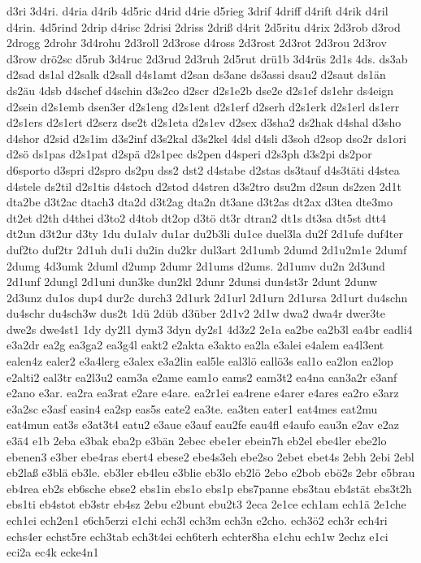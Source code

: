 {d3ri
3d4ri.
d4ria
d4rib
4d5ric
d4rid
d4rie
d5rieg
3drif
4driff
d4rift
d4rik
d4ril
d4rin.
4d5rind
2drip
d4risc
2drisi
2driss
2driß
d4rit
2d5ritu
d4rix
2d3rob
d3rod
2drogg
2drohr
3d4rohu
2d3roll
2d3rose
d4ross
2d3rost
2d3rot
2d3rou
2d3rov
d3row
drö2sc
d5rub
3d4ruc
2d3rud
2d3ruh
2d5rut
drü1b
3d4rüs
2d1s
4ds.
ds3ab
d2sad
ds1al
d2salk
d2sall
d4s1amt
d2san
ds3ane
ds3assi
dsau2
d2saut
ds1än
ds2äu
4dsb
d4schef
d4schin
d3s2co
d2scr
d2s1e2b
dse2e
d2s1ef
ds1ehr
ds4eign
d2sein
d2s1emb
dsen3er
d2s1eng
d2s1ent
d2s1erf
d2serh
d2s1erk
d2s1erl
ds1err
d2s1ers
d2s1ert
d2serz
dse2t
d2s1eta
d2s1ev
d2sex
d3sha2
ds2hak
d4shal
d3sho
d4shor
d2sid
d2s1im
d3s2inf
d3s2kal
d3s2kel
4dsl
d4sli
d3soh
d2sop
dso2r
ds1ori
d2sö
ds1pas
d2s1pat
d2spä
d2s1pec
ds2pen
d4speri
d2s3ph
d3s2pi
ds2por
d6sporto
d3spri
d2spro
ds2pu
dss2
dst2
d4stabe
d2stas
ds3tauf
d4s3täti
d4stea
d4stele
ds2til
d2s1tis
d4stoch
d2stod
d4stren
d3s2tro
dsu2m
d2sun
ds2zen
2d1t
dta2be
d3t2ac
dtach3
dta2d
d3t2ag
dta2n
dt3ane
d3t2as
dt2ax
d3tea
dte3mo
dt2et
d2th
d4thei
d3to2
d4tob
dt2op
d3tö
dt3r
dtran2
dt1s
dt3sa
dt5st
dtt4
dt2un
d3t2ur
d3ty
1du
du1alv
du1ar
du2b3li
du1ce
duel3la
du2f
2d1ufe
duf4ter
duf2to
duf2tr
2d1uh
du1i
du2in
du2kr
dul3art
2d1umb
2dumd
2d1u2m1e
2dumf
2dumg
4d3umk
2duml
d2ump
2dumr
2d1ums
d2ums.
2d1umv
du2n
2d3und
2d1unf
2dungl
2d1uni
dun3ke
dun2kl
2dunr
2dunsi
dun4st3r
2dunt
2dunw
2d3unz
du1os
dup4
dur2c
durch3
2d1urk
2d1url
2d1urn
2d1ursa
2d1urt
du4schn
du4schr
du4sch3w
dus2t
1dü
2düb
d3über
2d1v2
2d1w
dwa2
dwa4r
dwer3te
dwe2s
dwe4st1
1dy
dy2l1
dym3
3dyn
dy2s1
4d3z2
2e1a
ea2be
ea2b3l
ea4br
eadli4
e3a2dr
ea2g
ea3ga2
ea3g4l
eakt2
e2akta
e3akto
ea2la
e3alei
e4alem
ea4l3ent
ealen4z
ealer2
e3a4lerg
e3alex
e3a2lin
eal5le
eal3lö
eallö3s
eal1o
ea2lon
ea2lop
e2alti2
eal3tr
ea2l3u2
eam3a
e2ame
eam1o
eams2
eam3t2
ea4na
ean3a2r
e3anf
e2ano
e3ar.
ea2ra
ea3rat
e2are
e4are.
ea2r1ei
ea4rene
e4arer
e4ares
ea2ro
e3arz
e3a2sc
e3asf
easin4
ea2sp
eas5s
eate2
ea3te.
ea3ten
eater1
eat4mes
eat2mu
eat4mun
eat3s
e3at3t4
eatu2
e3aue
e3auf
eau2fe
eau4fl
e4aufo
eau3n
e2av
e2az
e3ä4
e1b
2eba
e3bak
eba2p
e3bän
2ebec
ebe1er
ebein7h
eb2el
ebe4ler
ebe2lo
ebenen3
e3ber
ebe4ras
ebert4
ebese2
ebe4s3eh
ebe2so
2ebet
ebet4s
2ebh
2ebi
2ebl
eb2laß
e3blä
eb3le.
eb3ler
eb4leu
e3blie
eb3lo
eb2lö
2ebo
e2bob
ebö2s
2ebr
e5brau
eb4rea
eb2s
eb6sche
ebse2
ebs1in
ebs1o
ebs1p
ebs7panne
ebs3tau
eb4stät
ebs3t2h
ebs1ti
eb4stot
eb3str
eb4sz
2ebu
e2bunt
ebu2t3
2eca
2e1ce
ech1am
ech1ä
2e1che
ech1ei
ech2en1
e6ch5erzi
e1chi
ech3l
ech3m
ech3n
e2cho.
ech3ö2
ech3r
ech4ri
echs4er
echst5re
ech3tab
ech3t4ei
ech6terh
echter8ha
e1chu
ech1w
2echz
e1ci
eci2a
ec4k
ecke4n1
}
